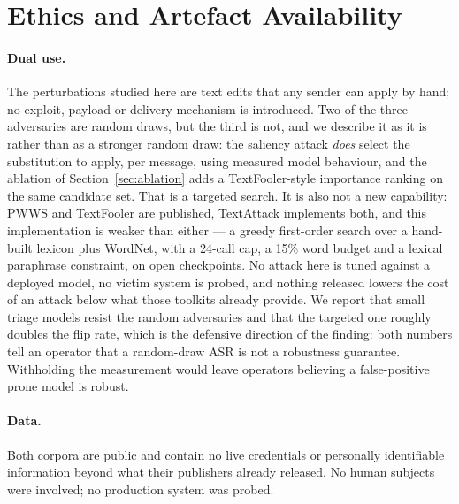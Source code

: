 \section{Ethics and Artefact Availability}
\label{sec:ethics}

\paragraph{Dual use.} The perturbations studied here are text edits that any
sender can apply by hand; no exploit, payload or delivery mechanism is
introduced. Two of the three adversaries are random draws, but the third is
not, and we describe it as it is rather than as a stronger random draw: the
saliency attack \emph{does} select the substitution to apply, per message, using
measured model behaviour, and the ablation of Section~\ref{sec:ablation} adds a
TextFooler-style importance ranking on the same candidate set. That is a
targeted search. It is also not a new capability: PWWS and TextFooler are published, TextAttack
implements both, and this implementation is weaker than either --- a greedy
first-order search over a hand-built lexicon plus WordNet, with a 24-call cap,
a 15\% word budget and a lexical paraphrase constraint, on open checkpoints.
No attack here is tuned against a deployed model, no victim system is
probed, and nothing released lowers the cost of an attack below what those
toolkits already provide. We report that small triage models resist the random
adversaries and that the targeted one roughly doubles the flip rate, which is
the defensive direction of the finding: both numbers tell an operator that a
random-draw ASR is not a robustness guarantee. Withholding the measurement
would leave operators believing a false-positive prone model is robust.

\paragraph{Data.} Both corpora are public and contain no live credentials or
personally identifiable information beyond what their publishers already
released. No human subjects were involved; no production system was probed.

